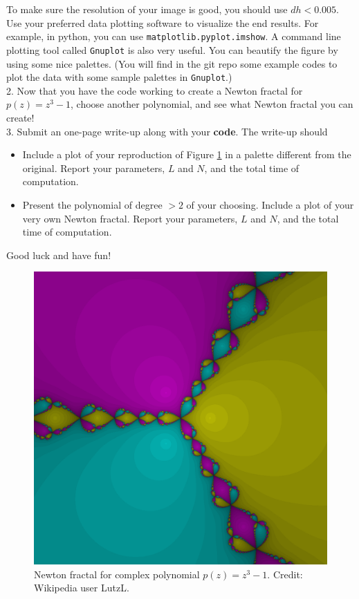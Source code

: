 \documentclass{article}
\begin{document}
To make sure the resolution of your image is good, you should use $dh<0.005$.
Use your preferred data plotting software to visualize the end results. For example, in python, you can use \texttt{matplotlib.pyplot.imshow}. A command line plotting tool called \texttt{Gnuplot} is also very useful.
You can beautify the figure by using some nice palettes. (You will find in the git repo some example codes to plot the data with some sample palettes in \texttt{Gnuplot}.)
\\

2. Now that you have the code working to create a Newton fractal for $p(z) = z^3-1$, choose another polynomial, and see what Newton fractal you can create!
\\

3. Submit an one-page write-up along with your \textbf{code}. The write-up should 
\begin{itemize}
 \item Include a plot of your reproduction of Figure \ref{fig:nfrac} in a palette different from the original. Report your parameters, $L$ and $N$, and the total time of computation.
 \item Present the polynomial of degree $>2$ of your choosing. Include a plot of your very own Newton fractal. Report your parameters, $L$ and $N$, and the total time of computation.
\end{itemize}
Good luck and have fun!
 
\begin{figure}[t]
\centering
\includegraphics[width = \linewidth]{Newtroot_1_0_0_m1.png}
\caption{Newton fractal for complex polynomial $p(z) = z^3 - 1$. Credit: Wikipedia user LutzL.}
\label{fig:nfrac}
\end{figure}
\end{document}
